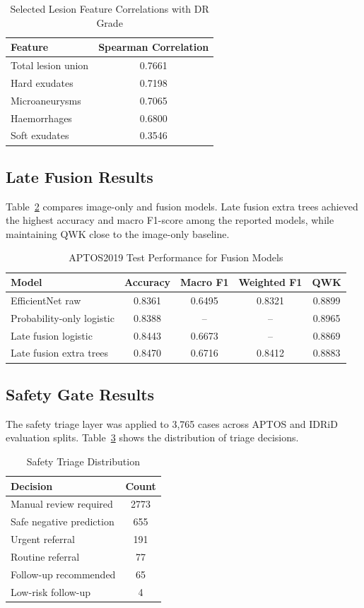 \documentclass[conference]{IEEEtran}
\begin{document}
\begin{table}[htbp]
\centering
\caption{Selected Lesion Feature Correlations with DR Grade}
\label{tab:correlation}
\begin{tabular}{lc}
\toprule
Feature & Spearman Correlation \\
\midrule
Total lesion union & 0.7661 \\
Hard exudates & 0.7198 \\
Microaneurysms & 0.7065 \\
Haemorrhages & 0.6800 \\
Soft exudates & 0.3546 \\
\bottomrule
\end{tabular}
\end{table}

\subsection{Late Fusion Results}
Table~\ref{tab:fusion} compares image-only and fusion models. Late fusion extra trees achieved the highest accuracy and macro F1-score among the reported models, while maintaining QWK close to the image-only baseline.

\begin{table}[htbp]
\centering
\caption{APTOS2019 Test Performance for Fusion Models}
\label{tab:fusion}
\begin{tabular}{lcccc}
\toprule
Model & Accuracy & Macro F1 & Weighted F1 & QWK \\
\midrule
EfficientNet raw & 0.8361 & 0.6495 & 0.8321 & 0.8899 \\
Probability-only logistic & 0.8388 & -- & -- & 0.8965 \\
Late fusion logistic & 0.8443 & 0.6673 & -- & 0.8869 \\
Late fusion extra trees & 0.8470 & 0.6716 & 0.8412 & 0.8883 \\
\bottomrule
\end{tabular}
\end{table}

\subsection{Safety Gate Results}
The safety triage layer was applied to 3,765 cases across APTOS and IDRiD evaluation splits. Table~\ref{tab:safety} shows the distribution of triage decisions.

\begin{table}[htbp]
\centering
\caption{Safety Triage Distribution}
\label{tab:safety}
\begin{tabular}{lc}
\toprule
Decision & Count \\
\midrule
Manual review required & 2773 \\
Safe negative prediction & 655 \\
Urgent referral & 191 \\
Routine referral & 77 \\
Follow-up recommended & 65 \\
Low-risk follow-up & 4 \\
\bottomrule
\end{tabular}
\end{table}
\end{document}
